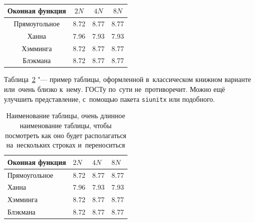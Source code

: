 \begin{table} [htbp]%
    \centering
    \begin{threeparttable}%
        \caption{}%
        \label{tab:test1}%
        \begin{SingleSpace}
            \begin{tabular}{| c | c | c | c |}
                \hline
                Оконная функция & \({2N}\) & \({4N}\) & \({8N}\) \\ \hline
                Прямоугольное   & 8.72     & 8.77     & 8.77     \\ \hline
                Ханна           & 7.96     & 7.93     & 7.93     \\ \hline
                Хэмминга        & 8.72     & 8.77     & 8.77     \\ \hline
                Блэкмана        & 8.72     & 8.77     & 8.77     \\ \hline
            \end{tabular}%
        \end{SingleSpace}
    \end{threeparttable}
\end{table}

Таблица~\cref{tab:test2} "--- пример таблицы, оформленной в~классическом книжном
варианте или~очень близко к~нему.
\mbox{ГОСТу} по~сути не~противоречит.
Можно ещё улучшить представление, с~помощью пакета \verb|siunitx| или подобного.

\begin{table} [htbp]%
    \centering
    \caption{Наименование таблицы, очень длинное наименование таблицы, чтобы посмотреть как оно будет располагаться на~нескольких строках и~переноситься}%
    \label{tab:test2}%
    \renewcommand{\arraystretch}{1.5}%
    \begin{SingleSpace}
        \begin{tabular}{@{}@{\extracolsep{20pt}}llll@{}} %
            \toprule     %
            Оконная функция & \({2N}\) & \({4N}\) & \({8N}\) \\
            \midrule %
            Прямоугольное   & 8.72     & 8.77     & 8.77     \\
            Ханна           & 7.96     & 7.93     & 7.93     \\
            Хэмминга        & 8.72     & 8.77     & 8.77     \\
            Блэкмана        & 8.72     & 8.77     & 8.77     \\
            \bottomrule %
        \end{tabular}%
    \end{SingleSpace}
\end{table}


